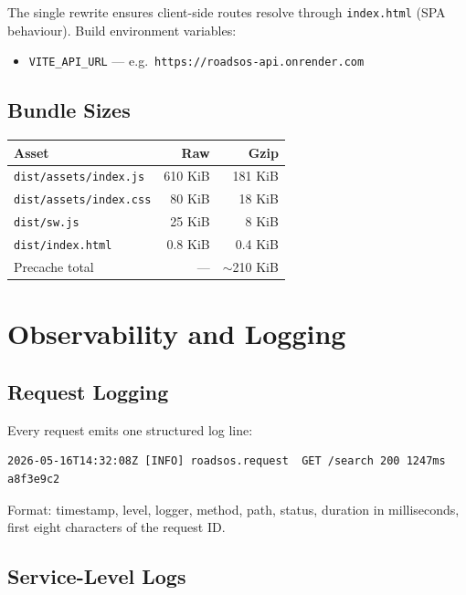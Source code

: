 \documentclass[11pt, a4paper]{article}
\newcommand{\code}[1]{\texttt{\small#1}}
\begin{document}
The single rewrite ensures client-side routes resolve through \code{index.html} (SPA behaviour). Build environment variables:

\begin{itemize}[leftmargin=*, itemsep=2pt, topsep=2pt]
  \item \code{VITE\_API\_URL} --- e.g.\ \code{https://roadsos-api.onrender.com}
\end{itemize}

\subsection{Bundle Sizes}

\begin{tabularx}{\textwidth}{l r r}
\toprule
\textbf{Asset} & \textbf{Raw} & \textbf{Gzip} \\
\midrule
\code{dist/assets/index.js} & 610 KiB & 181 KiB \\
\code{dist/assets/index.css} & 80 KiB & 18 KiB \\
\code{dist/sw.js} & 25 KiB & 8 KiB \\
\code{dist/index.html} & 0.8 KiB & 0.4 KiB \\
Precache total & --- & $\sim$210 KiB \\
\bottomrule
\end{tabularx}

\section{Observability and Logging}

\subsection{Request Logging}

Every request emits one structured log line:

\begin{lstlisting}[numbers=none,frame=none]
2026-05-16T14:32:08Z [INFO] roadsos.request  GET /search 200 1247ms a8f3e9c2
\end{lstlisting}

Format: timestamp, level, logger, method, path, status, duration in milliseconds, first eight characters of the request ID.

\subsection{Service-Level Logs}
\end{document}
